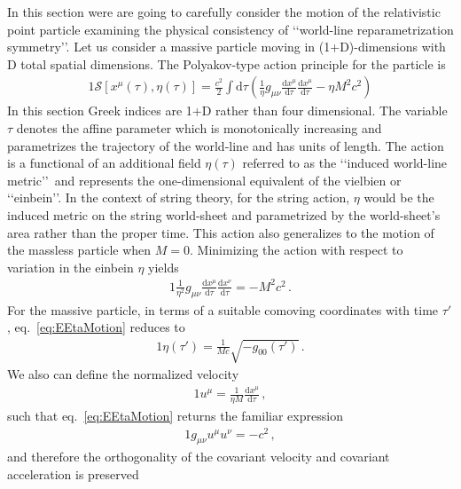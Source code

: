 In this section were are going to carefully consider the motion of the relativistic point particle examining the physical consistency of \lq\lq world-line reparametrization symmetry\rq\rq. Let us consider a massive particle moving in (1+D)-dimensions with D total spatial dimensions. The Polyakov-type action principle for the particle is
\begin{alignat}{1}
	\label{eq:EPolyakovAction}\mathcal{S}[x^{\mu}(\tau),\eta(\tau)]=\frac{c^{2}}{2}\int\mathrm{d}\tau\left(\frac{1}{\eta}g_{\mu\nu}\frac{\mathrm{d}x^{\mu}}{\mathrm{d}\tau}\frac{\mathrm{d}x^{\mu}}{\mathrm{d}\tau}-\eta M^{2}c^{2}\right)
\end{alignat}
In this section Greek indices are 1+D rather than four dimensional. The variable $\tau$ denotes the affine parameter which is monotonically increasing and parametrizes the trajectory of the world-line and has units of length. The action is a functional of an additional field $\eta(\tau)$ referred to as the \lq\lq induced world-line metric\rq\rq\ and represents the one-dimensional equivalent of the vielbien or \lq\lq einbein\rq\rq. In the context of string theory, for the string action, $\eta$ would be the induced metric on the string world-sheet and parametrized by the world-sheet's area rather than the proper time. This action also generalizes to the motion of the massless particle when $M=0$. Minimizing the action with respect to variation in the einbein $\eta$ yields
\begin{alignat}{1}
	\label{eq:EEtaMotion}\frac{1}{\eta^{2}}g_{\mu\nu}\frac{\mathrm{d}x^{\mu}}{\mathrm{d}\tau}\frac{\mathrm{d}x^{\nu}}{\mathrm{d}\tau}=-M^{2}c^{2}\,.
\end{alignat}
For the massive particle, in terms of a suitable comoving coordinates with time $\tau'$, eq.~\eqref{eq:EEtaMotion} reduces to
\begin{alignat}{1}
	\label{eq:EEtaMotionMetric}\eta(\tau')=\frac{1}{Mc}\sqrt{-g_{00}(\tau')}\,.
\end{alignat}
We also can define the normalized velocity
\begin{alignat}{1}
	\label{eq:EEtaMomentum}u^{\mu}=\frac{1}{\eta M}\frac{\mathrm{d}x^{\mu}}{\mathrm{d}\tau}\,
,\end{alignat}
such that eq.~\eqref{eq:EEtaMotion} returns the familiar expression
\begin{alignat}{1}
	\label{eq:EEtaMotionNorm}g_{\mu\nu}u^{\mu}u^{\nu}=-c^{2}\,,
\end{alignat}
and therefore the orthogonality of the covariant velocity and covariant acceleration is preserved
